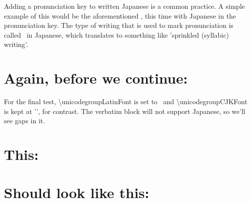 ﻿\documentclass[12pt]{article}
\begin{document}
    Adding a pronunciation key to written Japanese is a common practice. A simple example of this would 
    be the aforementioned , this time with Japanese in the pronunciation key.
    The type of writing that is used to mark pronunciation is called \ in Japanese,
    which translates to something like 'sprinkled (syllabic) writing'.


  \section{Again, before we continue:}


  For the final test, \textbackslash unicodegroupLatinFont is set to \unicodegroupLatinFont\ 
  and \textbackslash unicodegroupCJKFont is kept at '\unicodegroupLatinFont', for contrast.
  The verbatim block will not support Japanese, so we'll see gaps in it.
  
  \section{This:}
  
  \begin{verbatimfontwrap}
  \end{verbatimfontwrap}
  
  \section{Should look like this:}
\end{document}
